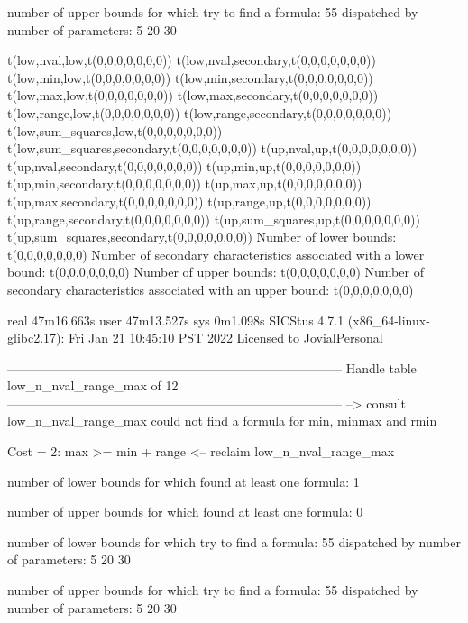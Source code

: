 number of upper bounds for which try to find a formula: 55
dispatched by number of parameters: 5  20  30

t(low,nval,low,t(0,0,0,0,0,0,0))
t(low,nval,secondary,t(0,0,0,0,0,0,0))
t(low,min,low,t(0,0,0,0,0,0,0))
t(low,min,secondary,t(0,0,0,0,0,0,0))
t(low,max,low,t(0,0,0,0,0,0,0))
t(low,max,secondary,t(0,0,0,0,0,0,0))
t(low,range,low,t(0,0,0,0,0,0,0))
t(low,range,secondary,t(0,0,0,0,0,0,0))
t(low,sum_squares,low,t(0,0,0,0,0,0,0))
t(low,sum_squares,secondary,t(0,0,0,0,0,0,0))
t(up,nval,up,t(0,0,0,0,0,0,0))
t(up,nval,secondary,t(0,0,0,0,0,0,0))
t(up,min,up,t(0,0,0,0,0,0,0))
t(up,min,secondary,t(0,0,0,0,0,0,0))
t(up,max,up,t(0,0,0,0,0,0,0))
t(up,max,secondary,t(0,0,0,0,0,0,0))
t(up,range,up,t(0,0,0,0,0,0,0))
t(up,range,secondary,t(0,0,0,0,0,0,0))
t(up,sum_squares,up,t(0,0,0,0,0,0,0))
t(up,sum_squares,secondary,t(0,0,0,0,0,0,0))
Number of lower bounds:                                             t(0,0,0,0,0,0,0)
Number of secondary characteristics associated with a lower bound:  t(0,0,0,0,0,0,0)
Number of upper bounds:                                             t(0,0,0,0,0,0,0)
Number of secondary characteristics associated with an upper bound: t(0,0,0,0,0,0,0)

real	47m16.663s
user	47m13.527s
sys	0m1.098s
SICStus 4.7.1 (x86_64-linux-glibc2.17): Fri Jan 21 10:45:10 PST 2022
Licensed to JovialPersonal


--------------------------------------------------------------------------------
Handle table low_n_nval_range_max of 12
--------------------------------------------------------------------------------
--> consult low_n_nval_range_max
could not find a formula for min, minmax and rmin

Cost =  2:  max >= min + range
<-- reclaim low_n_nval_range_max

number of lower bounds for which found at least one formula: 1

number of upper bounds for which found at least one formula: 0

number of lower bounds for which try to find a formula: 55
dispatched by number of parameters: 5  20  30

number of upper bounds for which try to find a formula: 55
dispatched by number of parameters: 5  20  30

